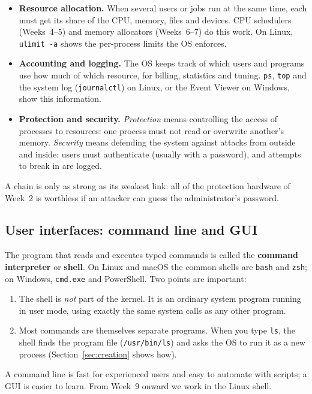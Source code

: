 \documentclass[11pt,a4paper]{article}
\newcommand{\term}[1]{\textbf{\color{mintdeep}#1}}
\newcommand{\cmd}[1]{\texttt{#1}}
\begin{document}
\begin{itemize}
  \item \textbf{Resource allocation.} When several users or jobs run at the same time, each must get its share of the CPU, memory, files and devices. CPU schedulers (Weeks~4--5) and memory allocators (Weeks~6--7) do this work. On Linux, \cmd{ulimit -a} shows the per-process limits the OS enforces.
  \item \textbf{Accounting and logging.} The OS keeps track of which users and programs use how much of which resource, for billing, statistics and tuning. \cmd{ps}, \cmd{top} and the system log (\cmd{journalctl}) on Linux, or the Event Viewer on Windows, show this information.
  \item \textbf{Protection and security.} \emph{Protection} means controlling the access of processes to resources: one process must not read or overwrite another's memory. \emph{Security} means defending the system against attacks from outside and inside: users must authenticate (usually with a password), and attempts to break in are logged.
\end{itemize}

A chain is only as strong as its weakest link: all of the protection hardware of Week~2 is worthless if an attacker can guess the administrator's password.

\subsection{User interfaces: command line and GUI}

The program that reads and executes typed commands is called the \term{command interpreter} or \term{shell}. On Linux and macOS the common shells are \cmd{bash} and \cmd{zsh}; on Windows, \cmd{cmd.exe} and PowerShell. Two points are important:

\begin{enumerate}[leftmargin=1.4em]
  \item The shell is \emph{not} part of the kernel. It is an ordinary system program running in user mode, using exactly the same system calls as any other program.
  \item Most commands are themselves separate programs. When you type \cmd{ls}, the shell finds the program file (\texttt{/usr/\allowbreak bin/\allowbreak ls}) and asks the OS to run it as a new process (Section~\ref{sec:creation} shows how).
\end{enumerate}

A command line is fast for experienced users and easy to automate with scripts; a GUI is easier to learn. From Week~9 onward we work in the Linux shell.
\end{document}
